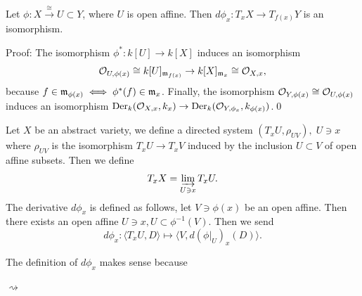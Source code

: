 \begin{dang}
    \begin{lemma}
        Let $\phi:X\overset{\cong}{\to} U\subset Y$, where $U$ is open affine. Then 
        $d\phi_x: T_xX\to T_{f(x)}Y$ is an isomorphism.
    \end{lemma}
\end{dang}
Proof: The isomorphism $\phi^*:k[U]\to k[X]$ induces an isomorphism 
\begin{equation}
    \mathcal{O}_{U,\phi(x)}\cong k[U]_{\mathfrak{m}_{f(x)}}\to k[X]_{\mathfrak{m}_x}\cong\mathcal{O}_{X,x},
\end{equation}
because
$f\in\mathfrak{m}_{\phi(x)}\iff \phi^{*}(f)\in\mathfrak{m}_x$. Finally, the isomorphism $\mathcal{O}_{Y,\phi(x)}\cong\mathcal{O}_{U,\phi(x)}$
induces an isomorphism $\text{Der}_k(\mathcal{O}_{X,x},k_x)\to \text{Der}_k(\mathcal{O}_{Y,\phi_x},k_{\phi(x)})$.\qed

\begin{dang}
    \begin{definition}
        Let $X$ be an abstract variety, we define a directed system $(T_xU, \rho_{UV}),\;U\ni x$ where 
        $\rho_{UV}$ is the isomorphism $T_xU\to T_xV$ induced by the inclusion $U\subset V$ of open affine 
        subsets. Then we define 
        \begin{equation}
            T_xX = \varinjlim_{U\ni x} T_xU.
        \end{equation}
        The derivative $d\phi_x$ is defined as follows, let $V\ni \phi(x)$ be an open affine. Then 
        there exists an open affine $U\ni x, U\subset \phi^{-1}(V)$. Then we send 
        \begin{equation}
            d\phi_x: \langle T_xU, D\rangle \mapsto \langle V, d(\phi|_U)_x(D)\rangle.
        \end{equation}
    \end{definition}
\end{dang}
The definition of $d\phi_x$ makes sense because 
\begin{center}
    $\rightsquigarrow$
\end{center}


